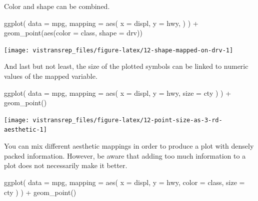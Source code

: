 \documentclass[]{book}
\newenvironment{Shaded}{}{}
\newcommand{\DataTypeTok}[1]{#1}
\newcommand{\KeywordTok}[1]{\textcolor[rgb]{0.00,0.00,1.00}{#1}}
\newcommand{\NormalTok}[1]{#1}
\newcommand{\OperatorTok}[1]{#1}
\newcommand{\StringTok}[1]{\textcolor[rgb]{0.00,0.50,0.50}{#1}}
\begin{document}
Color and shape can be combined.

\begin{Shaded}
\begin{Highlighting}[]
\KeywordTok{ggplot}\NormalTok{(}
  \DataTypeTok{data =}\NormalTok{ mpg,}
  \DataTypeTok{mapping =} \KeywordTok{aes}\NormalTok{(}
    \DataTypeTok{x =}\NormalTok{ displ,}
    \DataTypeTok{y =}\NormalTok{ hwy,}
\NormalTok{  )}
\NormalTok{) }\OperatorTok{+}
\StringTok{  }\KeywordTok{geom_point}\NormalTok{(}\KeywordTok{aes}\NormalTok{(}\DataTypeTok{color =}\NormalTok{ class, }\DataTypeTok{shape =}\NormalTok{ drv))}
\end{Highlighting}
\end{Shaded}

\begin{flushright}\texttt{[image: vistransrep\_files/figure-latex/12-shape-mapped-on-drv-1]} \end{flushright}

And last but not least, the size of the plotted symbols can be linked to numeric values of the mapped variable.

\begin{Shaded}
\begin{Highlighting}[]
\KeywordTok{ggplot}\NormalTok{(}
  \DataTypeTok{data =}\NormalTok{ mpg,}
  \DataTypeTok{mapping =} \KeywordTok{aes}\NormalTok{(}
    \DataTypeTok{x =}\NormalTok{ displ,}
    \DataTypeTok{y =}\NormalTok{ hwy,}
    \DataTypeTok{size =}\NormalTok{ cty}
\NormalTok{  )}
\NormalTok{) }\OperatorTok{+}
\StringTok{  }\KeywordTok{geom_point}\NormalTok{()}
\end{Highlighting}
\end{Shaded}

\begin{flushright}\texttt{[image: vistransrep\_files/figure-latex/12-point-size-as-3-rd-aesthetic-1]} \end{flushright}

You can mix different aesthetic mappings in order to produce a plot with densely packed information.
However, be aware that adding too much information to a plot does not necessarily make it better.

\begin{Shaded}
\begin{Highlighting}[]
\KeywordTok{ggplot}\NormalTok{(}
  \DataTypeTok{data =}\NormalTok{ mpg,}
  \DataTypeTok{mapping =} \KeywordTok{aes}\NormalTok{(}
    \DataTypeTok{x =}\NormalTok{ displ,}
    \DataTypeTok{y =}\NormalTok{ hwy,}
    \DataTypeTok{color =}\NormalTok{ class,}
    \DataTypeTok{size =}\NormalTok{ cty}
\NormalTok{  )}
\NormalTok{) }\OperatorTok{+}
\StringTok{  }\KeywordTok{geom_point}\NormalTok{()}
\end{Highlighting}
\end{Shaded}
\end{document}
